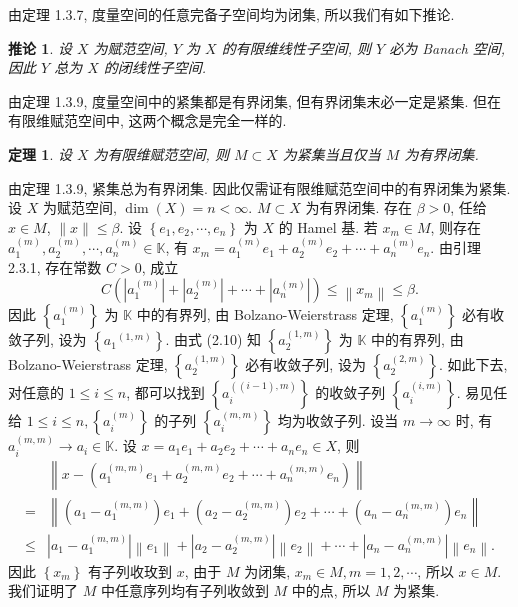 \documentclass[openany]{ctexbook}
\makeatletter
\theoremstyle{kaiti}
\newtheorem{theorem}{定理}[section]
\newtheorem{corollary}{推论}[section]
\theoremstyle{normal}
\renewenvironment{proof}[1][\proofname]{\par
    \pushQED{\qed}%
    \normalfont \topsep6\p@\@plus6\p@\relax
    \trivlist
    \item\relax
    {\heiti #1}\hspace{2\labelsep}\ignorespaces
  }{%
    \popQED\endtrivlist\@endpefalse
  }
\makeatother
\begin{document}
由定理 1.3.7, 度量空间的任意完备子空间均为闭集, 所以我们有如下推论.

\begin{corollary}
设 $X$ 为赋范空间, $Y$ 为 $X$ 的有限维线性子空间, 则 $Y$ 必为 Banach 空间, 因此 $Y$ 总为 $X$ 的闭线性子空间.
\end{corollary}

由定理 1.3.9, 度量空间中的紧集都是有界闭集, 但有界闭集末必一定是紧集. 但在有限维赋范空间中, 这两个概念是完全一样的.

\begin{theorem}
设 $X$ 为有限维赋范空间, 则 $M \subset X$ 为紧集当且仅当 $M$ 为有界闭集. 
\end{theorem}

\begin{proof}
由定理 1.3.9, 紧集总为有界闭集. 因此仅需证有限维赋范空间中的有界闭集为紧集. 设 $X$ 为赋范空间, $\operatorname{dim}(X)=n<\infty$. $M \subset X$ 为有界闭集. 存在 $\beta>0$, 任给 $x \in M$, $\|x\| \leqslant \beta$. 设 $\left\{e_1, e_2, \cdots, e_n\right\}$ 为 $X$ 的 Hamel 基. 若 $x_m \in M$, 则存在 $a_1^{(m)}, a_2^{(m)}, \cdots, a_n^{(m)} \in \mathbb{K}$, 有 $x_m=a_1^{(m)} e_1+a_2^{(m)} e_2+\cdots+a_n^{(m)} e_n.$ 由引理 2.3.1, 存在常数 $C>0$, 成立
\begin{equation}
  C\left(\left|a_1^{(m)}\right|+\left|a_2^{(m)}\right|+\cdots+\left|a_n^{(m)}\right|\right) \leqslant\left\|x_m\right\| \leqslant \beta.
\end{equation}
因此 $\left\{a_1^{(m)}\right\}$ 为 $\mathbb{K}$ 中的有界列, 由 Bolzano-Weierstrass 定理, $\left\{a_1^{(m)}\right\}$ 必有收敛子列, 设为 $\left\{a_1{ }^{(1, m)}\right\}$. 由式 (2.10) 知 $\left\{a_2^{(1, m)}\right\}$ 为 $\mathbb{K}$ 中的有界列, 由 Bolzano-Weierstrass 定理, $\left\{a_2^{(1, m)}\right\}$ 必有收敛子列, 设为 $\left\{a_2^{(2, m)}\right\}$. 如此下去, 对任意的 $1 \leqslant i \leqslant n$, 都可以找到 $\left\{a_{i}^{((i-1), m)}\right\}$ 的收敛子列 $\left\{a_{i}^{(i, m)}\right\}$. 易见任给 $1 \leqslant i \leqslant n,\left\{a_{i}^{(m)}\right\}$ 的子列 $\left\{a_{i}^{(m, m)}\right\}$ 均为收敛子列. 设当 $m \rightarrow \infty$ 时, 有 $a_{i}^{(m, m)} \rightarrow a_{i} \in \mathbb{K}$.
设 $x=a_1 e_1+a_2 e_2+\cdots+a_n e_n \in X$, 则
$$
\begin{aligned}
&\left\|x-\left(a_1^{(m, m)} e_1+a_2^{(m, m)} e_2+\cdots+a_n^{(m, m)} e_n\right)\right\| \\
=&\left\|\left(a_1-a_1^{(m, m)}\right) e_1+\left(a_2-a_2^{(m, m)}\right) e_2+\cdots+\left(a_n-a_n^{(m, m)}\right) e_n\right\| \\
\leqslant &\left|a_1-a_1^{(m, m)}\right|\left\|e_1\right\|+\left|a_2-a_2^{(m, m)}\right|\left\|e_2\right\|+\cdots+\left|a_n-a_n^{(m, m)}\right|\left\|e_n\right\|.
\end{aligned}
$$
因此 $\left\{x_m\right\}$ 有子列收玫到 $x$, 由于 $M$ 为闭集, $x_m \in M, m=1,2, \cdots$, 所以 $x \in M$. 我们证明了 $M$ 中任意序列均有子列收敛到 $M$ 中的点, 所以 $M$ 为紧集.
\end{proof}
\end{document}
